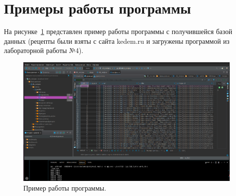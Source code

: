 \section{Примеры работы программы}

\hspace{1.25cm}
На рисунке~\ref{fig:img_example} представлен пример работы программы с получившейся базой данных (рецепты были взяты с сайта kedem.ru и загружены программой из лабораторной работы №4).

\begin{figure}[h]
    \centering
    \includegraphics[width=\linewidth]{img/example.png}
    \caption{Пример работы программы.}
    \label{fig:img_example}
\end{figure}
